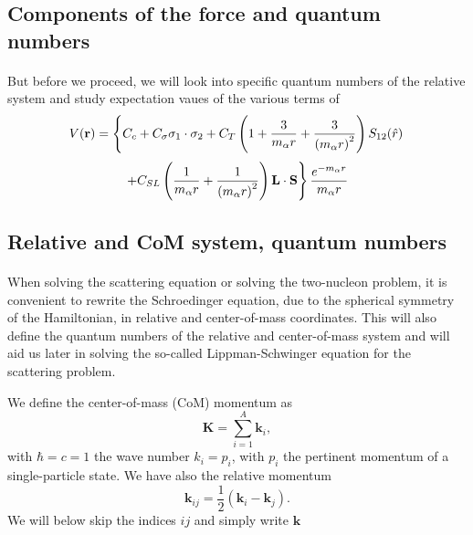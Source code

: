 \documentclass[%
twoside,                 %
final,                   %
10pt]{article}
\begin{document}
\noindent




\subsection*{Components of the force and quantum numbers}

\paragraph{}
But before we proceed, we will look into specific quantum numbers of the relative system and study 
expectation vaues of the various terms of
\[
V(\mathbf{r})= \left\{ C_c + C_\mathbf{\sigma} \mathbf{\sigma}_1\cdot\mathbf{\sigma}_2
 + C_T \left( 1 + {3\over m_\alpha r} + {3\over
\left(m_\alpha r\right)^2}\right) S_{12} (\hat r)\right. 
\]
\[
\left. + C_{SL} \left( {1\over m_\alpha r} + {1\over \left( m_\alpha r\right)^2}
\right) \mathbf{L}\cdot \mathbf{S}
\right\} \frac{e^{-m_\alpha r}}{m_\alpha r}
\]



\subsection*{Relative and CoM system, quantum numbers}

\paragraph{}

When solving the scattering equation or solving the two-nucleon problem, it is convenient to rewrite the Schroedinger equation, due to
the spherical symmetry of the Hamiltonian, in relative and center-of-mass coordinates. This will also define the quantum numbers of the relative and center-of-mass system and will aid us later in solving
the so-called Lippman-Schwinger equation for the scattering problem. 

We define the center-of-mass (CoM)  momentum as
 \[
    \mathbf{K}=\sum_{i=1}^A\mathbf{k}_i,
 \]
with $\hbar=c=1$ the wave number $k_i=p_i$, with $p_i$ the pertinent momentum of a single-particle state. 
We have also the relative momentum
\[
    \mathbf{k}_{ij}=\frac{1}{2}(\mathbf{k}_i-\mathbf{k}_j).
 \]
We will below skip the indices $ij$ and simply write $\mathbf{k}$
\end{document}
